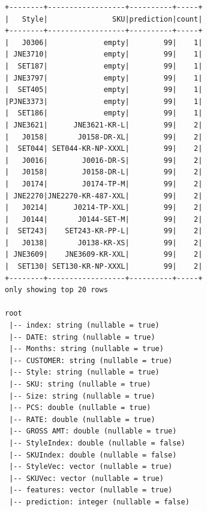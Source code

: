 \documentclass[11pt]{article}
\begin{document}
    \begin{Verbatim}[commandchars=\\\{\}]
+--------+------------------+----------+-----+
|   Style|               SKU|prediction|count|
+--------+------------------+----------+-----+
|   J0306|             empty|        99|    1|
| JNE3710|             empty|        99|    1|
|  SET187|             empty|        99|    1|
| JNE3797|             empty|        99|    1|
|  SET405|             empty|        99|    1|
|PJNE3373|             empty|        99|    1|
|  SET186|             empty|        99|    1|
| JNE3621|      JNE3621-KR-L|        99|    2|
|   J0158|       J0158-DR-XL|        99|    2|
|  SET044| SET044-KR-NP-XXXL|        99|    2|
|   J0016|        J0016-DR-S|        99|    2|
|   J0158|        J0158-DR-L|        99|    2|
|   J0174|        J0174-TP-M|        99|    2|
| JNE2270|JNE2270-KR-487-XXL|        99|    2|
|   J0214|      J0214-TP-XXL|        99|    2|
|   J0144|       J0144-SET-M|        99|    2|
|  SET243|    SET243-KR-PP-L|        99|    2|
|   J0138|       J0138-KR-XS|        99|    2|
| JNE3609|    JNE3609-KR-XXL|        99|    2|
|  SET130| SET130-KR-NP-XXXL|        99|    2|
+--------+------------------+----------+-----+
only showing top 20 rows

root
 |-- index: string (nullable = true)
 |-- DATE: string (nullable = true)
 |-- Months: string (nullable = true)
 |-- CUSTOMER: string (nullable = true)
 |-- Style: string (nullable = true)
 |-- SKU: string (nullable = true)
 |-- Size: string (nullable = true)
 |-- PCS: double (nullable = true)
 |-- RATE: double (nullable = true)
 |-- GROSS AMT: double (nullable = true)
 |-- StyleIndex: double (nullable = false)
 |-- SKUIndex: double (nullable = false)
 |-- StyleVec: vector (nullable = true)
 |-- SKUVec: vector (nullable = true)
 |-- features: vector (nullable = true)
 |-- prediction: integer (nullable = false)

    \end{Verbatim}

    \begin{Verbatim}[commandchars=\\\{\}]

    \end{Verbatim}
\end{document}
